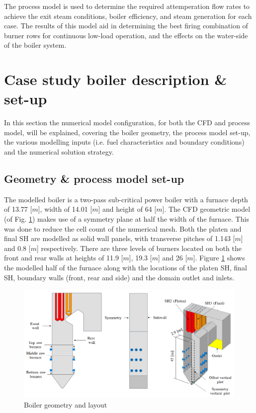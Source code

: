 \documentclass[11pt,cleanfoot]{asme2ej}
\begin{document}
The process model is used to determine the required attemperation flow rates to achieve the exit steam conditions, boiler efficiency, and steam generation for each case. The results of this model aid in determining the best firing combination of burner rows for continuous low-load operation, and the effects on the water-side of the boiler system.
\section{Case study boiler description \& set-up}
In this section the numerical model configuration, for both the CFD and process model, will be explained, covering the boiler geometry, the process model set-up, the various  modelling inputs (i.e. fuel characteristics and boundary conditions) and the numerical solution strategy.
\subsection{Geometry \& process model set-up} \label{sec_set_up}
The modelled  boiler is a two-pass sub-critical power boiler with a furnace depth of 13.77 [$m$], width of 14.01 [$m$] and height of 64 [$m$]. The CFD geometric model (of Fig. \ref{fig_geometry}) makes use of a symmetry plane at half the width of the furnace. This was done to reduce the cell count of the numerical mesh. Both the platen and final SH are modelled as solid wall panels, with transverse pitches of 1.143 [$m$] and 0.8 [$m$] respectively. There are three levels of burners located on both the front and rear walls at heights of 11.9 [$m$], 19.3 [$m$] and 26 [$m$]. Figure \ref{fig_geometry} shows the modelled half of the furnace along with the locations of the platen SH, final SH, boundary walls (front, rear and side) and the domain outlet and inlets.
\begin{figure} [h!]
\centerline{\includegraphics[scale=0.45]{GEOMETRY}}
\caption{Boiler geometry and layout}
\label{fig_geometry}
\end{figure}
\end{document}
